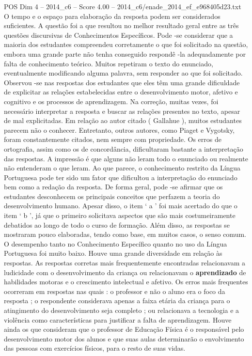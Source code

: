 \begin{textsample}{POS Dim 4 – 2014\_c6 – Score 4.00 – 2014\_c6/enade\_2014\_ef\_e968405d23.txt}
O tempo e o espaço para elaboração da resposta podem ser considerados suficientes.
A questão foi a que resultou no melhor resultado geral entre as três questões discursivas de Conhecimentos Específicos.
Pode -se considerar que a maioria dos estudantes compreendeu corretamente o que foi solicitado na questão, embora uma grande parte não tenha conseguido respondê -la adequadamente por falta de conhecimento teórico.
Muitos repetiram o texto do enunciado, eventualmente modificando alguma palavra, sem responder ao que foi solicitado.
Observou -se nas respostas dos estudantes que eles têm uma grande dificuldade de explicitar as relações estabelecidas entre o desenvolvimento motor, afetivo e cognitivo e os processos de aprendizagem.
Na correção, muitas vezes, foi necessário interpretar a resposta e buscar as relações presentes no texto, apesar de mal explicitadas.
Em relação ao autor citado ( Gallahue ), muitos estudantes parecem não o conhecer.
Entretanto, outros autores, como Piaget e Vygotsky, foram constantemente citados, nem sempre com propriedade.
Os erros de ortografia, assim como os de concordância, dificultaram bastante a interpretação das respostas.
A impressão é que alguns não leram todo o enunciado ou realmente não entenderam o que leram.
Ao que parece, o conhecimento restrito da Língua Portuguesa pode ter sido um fator que dificultou a interpretação do enunciado bem como a redação da resposta.
De forma geral, pode -se afirmar que os estudantes desconhecem os principais conceitos que perfazem a teoria do desenvolvimento humano.
Apesar disso, o item ‘ a ’ foi mais acertado do que o item ‘ b ’, já que o primeiro solicitava aspectos que são mais costumeiramente debatidos ao longo de todo o curso de formação.
Além disso, as respostas se mostraram pouco elaboradas, tendo como base, em muitos casos, o senso comum.
O desempenho tanto no Conhecimento Específico quanto no uso da Língua Portuguesa foi muito baixo.
Houve uma grande diversidade em relação às respostas.
As respostas corretas mais frequentemente encontradas relacionavam a ludicidade com o desenvolvimento da criança ou relacionavam o \textbf{aprendizado} de habilidades motoras e o crescimento intelectual e afetivo.
Os erros mais frequentes ocorreram em respostas nas quais : o professor e não o aluno era o foco da resposta ; o respondente considerava apenas a faixa etária da criança para o atingimento do desenvolvimento seja completo ; ou relacionava a tecnologia e a violência como características para justificar a falta de aprendizagem.
Houve ainda os que consideram que o professor de Educação Física é o responsável pelo desenvolvimento motor dos alunos e que suas aulas determinarão o envolvimento das pessoas com exercícios físicos, para o resto de suas vidas.

\end{textsample}
